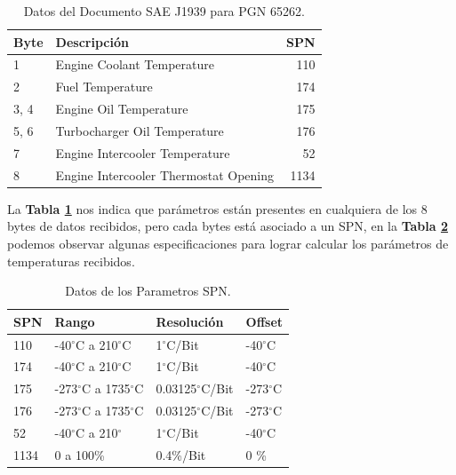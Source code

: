 \begin{table}[htb]
	\begin{center}
		\begin{tabular}{l l r}
			\toprule
			Byte & Descripción & SPN \\
			\midrule
			1 & Engine Coolant Temperature   & 110\\ 
			2 & Fuel Temperature  & 174\\ 
			3, 4 & Engine Oil Temperature   & 175 \\ 
			5, 6 & Turbocharger Oil Temperature & 176 \\ 
			7    & Engine Intercooler Temperature & 52  \\ 
			8    & Engine Intercooler Thermostat Opening & 1134 \\
			\bottomrule
		\end{tabular}
		\caption{Datos del Documento SAE J1939 para PGN 65262.}
		\label{tabla5}
	\end{center}
\end{table}

La \textbf{Tabla \ref{tabla5}} nos indica que parámetros están presentes en cualquiera de los 8 bytes de datos recibidos, pero cada bytes está asociado a un SPN, en la \textbf{Tabla \ref{tb_spn}} podemos observar algunas especificaciones para lograr calcular los parámetros de temperaturas recibidos. 

\begin{table}[htb]
	\begin{center}
		\begin{tabular}{ l l l l } 
			\toprule
			SPN & Rango & Resolución & Offset \\
			\midrule
			110 &-40$^{\circ}$C a 210$^{\circ}$C & 1$^{\circ}$C/Bit & -40$^{\circ}$C\\ 
			\hline
			174 &-40$^{\circ}$C a 210$^{\circ}$C & 1$^{\circ}$C/Bit & -40$^{\circ}$C\\ \hline
			175 &-273$^{\circ}$C a 1735$^{\circ}$C & 0.03125$^{\circ}$C/Bit & -273$^{\circ}$C\\ \hline
			176 &-273$^{\circ}$C a 1735$^{\circ}$C & 0.03125$^{\circ}$C/Bit & -273$^{\circ}$C\\ \hline
			52    & -40$^{\circ}$C a 210$^{\circ}$ & 1$^{\circ}$C/Bit & -40$^{\circ}$C\\ \hline
			1134   &  0 a 100\%     & 0.4\%/Bit & 0 \% \\ \hline
		\end{tabular}
		\caption{Datos de los Parametros SPN.}
		\label{tb_spn}
	\end{center}
\end{table}

